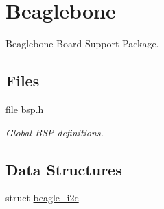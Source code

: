 \hypertarget{group__RTEMSBSPsARMBeagle}{}\section{Beaglebone}
\label{group__RTEMSBSPsARMBeagle}


Beaglebone Board Support Package.  


\subsection*{Files}
\begin{DoxyCompactItemize}
\item 
file \mbox{\hyperlink{bsps_2arm_2beagle_2include_2bsp_8h}{bsp.\+h}}
\begin{DoxyCompactList}\small\item\em Global B\+SP definitions. \end{DoxyCompactList}\end{DoxyCompactItemize}
\subsection*{Data Structures}
\begin{DoxyCompactItemize}
\item 
struct \mbox{\hyperlink{structbeagle__i2c}{beagle\+\_\+i2c}}
\end{DoxyCompactItemize}
